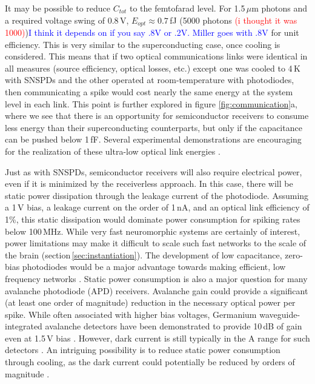 \documentclass[twocolumn]{article}
\begin{document}
It may be possible to reduce $C_{tot}$ to the femtofarad level. For 1.5\,$\mu$m photons and a required voltage swing of 0.8\,V, $E_{opt} \approx 0.7 $\,fJ (5000 photons \textcolor{red}{(i thought it was 1000)})\textcolor{blue}{I think it depends on if you say .8V or .2V. Miller goes with .8V} for unit efficiency. This is very similar to the superconducting case, once cooling is considered. This means that if two optical communications links were identical in all measures (source efficiency, optical losses, etc.) except one was cooled to 4\,K with SNSPDs and the other operated at room-temperature with photodiodes, then communicating a spike would cost nearly the same energy at the system level in each link. This point is further explored in figure \ref{fig:communication}a, where we see that there is an opportunity for semiconductor receivers to consume less energy than their superconducting counterparts, but only if the capacitance can be pushed below 1\,fF. Several experimental demonstrations are encouraging for the realization of these ultra-low optical link energies \cite{derose2011ultra, tossoun2019ultra, nozaki2016photonic}.

Just as with SNSPDs, semiconductor receivers will also require electrical power, even if it is minimized by the receiverless approach. In this case, there will be static power dissipation through the leakage current of the photodiode. Assuming a 1\,V bias, a leakage current on the order of 1\,nA, and an optical link efficiency of 1\%, this static dissipation would dominate power consumption for spiking rates below 100\,MHz. While very fast neuromorphic systems are certainly of interest, power limitations may make it difficult to scale such fast networks to the scale of the brain (section\,\ref{sec:instantiation}). The development of low capacitance, zero-bias photodiodes would be a major advantage towards making efficient, low frequency networks \cite{nozaki2018forward}. Static power consumption is also a major question for many avalanche photodiode (APD) receivers. Avalanche gain could provide a significant (at least one order of magnitude) reduction in the necessary optical power \cite{miller2017attojoule} per spike. While often associated with higher bias voltages, Germanium waveguide-integrated avalanche detectors have been demonstrated to provide 10\,dB of gain even at 1.5\,V bias \cite{assefa2010reinventing}. However, dark current is still typically in the \textmu A range for such detectors \cite{assefa2010reinventing, virot2014germanium}. An intriguing possibility is to reduce static power consumption through cooling, as the dark current could potentially be reduced by orders of magnitude \cite{pizzone2020analysis}.  
\end{document}

